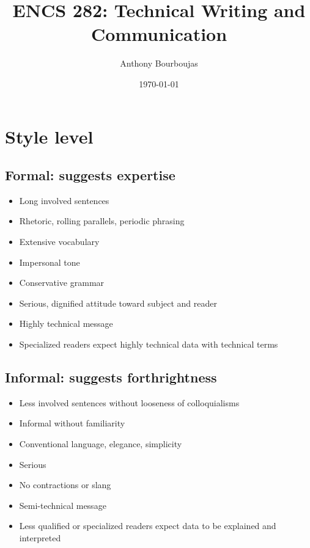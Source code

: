 \documentclass[10pt, twocolumn]{article}
\title{ENCS 282: Technical Writing and Communication}
\date{\today}
\author{Anthony Bourboujas}
\begin{document}
\maketitle %

\section{Style level}
\subsection{Formal: suggests expertise}
\begin{itemize}
  \item Long involved sentences
  \item Rhetoric, rolling parallels, periodic phrasing
  \item Extensive vocabulary
  \item Impersonal tone
  \item Conservative grammar
  \item Serious, dignified attitude toward subject and reader
  \item Highly technical message
  \item Specialized readers expect highly technical data with technical terms
\end{itemize}


\subsection{Informal: suggests forthrightness}
\begin{itemize}
  \item Less involved sentences without looseness of colloquialisms
  \item Informal without familiarity
  \item Conventional language, elegance, simplicity
  \item Serious
  \item No contractions or slang
  \item Semi-technical message
  \item Less qualified or specialized readers expect data to be explained and interpreted
\end{itemize}
\end{document}
